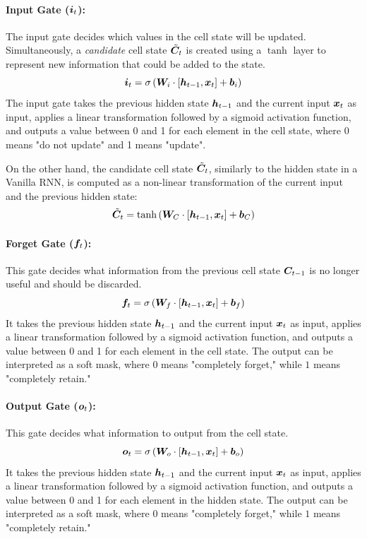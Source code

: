 \paragraph{Input Gate ($\boldsymbol{i}_t$):}
The input gate decides which values in the cell state will be updated.
Simultaneously, a \textit{candidate} cell state $\tilde{\boldsymbol{C}}_t$ is created using a $\tanh$ layer to represent new information that could be added to the state.
\begin{equation}
    \boldsymbol{i}_t = \sigma\left(\boldsymbol{W}_i \cdot [\boldsymbol{h}_{t-1}, \boldsymbol{x}_t] + \boldsymbol{b}_i\right)
\end{equation}
The input gate takes the previous hidden state $\boldsymbol{h}_{t-1}$ and the current input $\boldsymbol{x}_t$ as input, applies a linear transformation followed by a sigmoid activation function,
and outputs a value between 0 and 1 for each element in the cell state, where 0 means "do not update" and 1 means "update".

On the other hand, the candidate cell state $\tilde{\boldsymbol{C}}_t$, similarly to the hidden state in a Vanilla RNN,
is computed as a non-linear transformation of the current input and the previous hidden state:
\begin{equation}
    \tilde{\boldsymbol{C}}_t = \tanh\left(\boldsymbol{W}_C \cdot [\boldsymbol{h}_{t-1}, \boldsymbol{x}_t] + \boldsymbol{b}_C\right)
\end{equation}

\paragraph{Forget Gate ($\boldsymbol{f}_t$):}
This gate decides what information from the previous cell state $\boldsymbol{C}_{t-1}$ is no longer useful and should be discarded.
\begin{equation}
    \boldsymbol{f}_t = \sigma\left(\boldsymbol{W}_f \cdot [\boldsymbol{h}_{t-1}, \boldsymbol{x}_t] + \boldsymbol{b}_f\right)
\end{equation}
It takes the previous hidden state $\boldsymbol{h}_{t-1}$ and the current input $\boldsymbol{x}_t$ as input, applies a linear transformation followed by a sigmoid activation function,
and outputs a value between 0 and 1 for each element in the cell state.
The output can be interpreted as a soft mask, where $0$ means "completely forget," while $1$ means "completely retain."

\paragraph{Output Gate ($\boldsymbol{o}_t$):}
This gate decides what information to output from the cell state.
\begin{equation}
    \boldsymbol{o}_t = \sigma\left(\boldsymbol{W}_o \cdot [\boldsymbol{h}_{t-1}, \boldsymbol{x}_t] + \boldsymbol{b}_o\right)
\end{equation}
It takes the previous hidden state $\boldsymbol{h}_{t-1}$ and the current input $\boldsymbol{x}_t$ as input, applies a linear transformation followed by a sigmoid activation function,
and outputs a value between 0 and 1 for each element in the hidden state.
The output can be interpreted as a soft mask, where $0$ means "completely forget," while $1$ means "completely retain."

